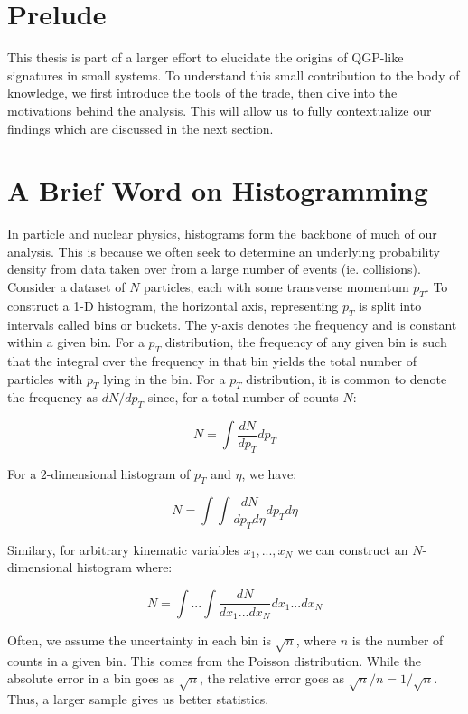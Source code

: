 \documentclass[../main.tex]{subfiles}
\begin{document}
\section{Prelude}
This thesis is part of a larger effort to elucidate the origins of QGP-like signatures in small systems. To understand this small contribution to the body of knowledge, we first introduce the tools of the trade, then dive into the motivations behind the analysis. This will allow us to fully contextualize our findings which are discussed in the next section.

\section{A Brief Word on Histogramming}

In particle and nuclear physics, histograms form the backbone of much of our analysis. This is because we often seek to determine an underlying probability density from data taken over from a large number of events (ie. collisions). Consider a dataset of $N$ particles, each with some transverse momentum $p_T$. To construct a 1-D histogram, the horizontal axis, representing $p_T$ is split into intervals called bins or buckets. The y-axis denotes the frequency and is constant within a given bin. For a $p_T$ distribution, the frequency of any given bin is such that the integral over the frequency in that bin yields the total number of particles with $p_T$ lying in the bin. For a $p_T$ distribution, it is common to denote the frequency as $dN/dp_T$ since, for a total number of counts $N$:

\begin{equation}
    N = \int \frac{dN}{dp_T} dp_T
\end{equation}

For a $2$-dimensional histogram of $p_T$ and $\eta$, we have:

\begin{equation}
    N = \int \int \frac{dN}{dp_T d\eta} dp_T d\eta
\end{equation}

Similary, for arbitrary kinematic variables $x_1,...,x_N$ we can construct an $N$-dimensional histogram where:

\begin{equation}
    N = \int ... \int \frac{dN}{dx_1...dx_N} dx_1...dx_N  
\end{equation}

Often, we assume the uncertainty in each bin is $\sqrt{n}$, where $n$ is the number of counts in a given bin. This comes from the Poisson distribution. While the absolute error in a bin goes as $\sqrt{n}$, the relative error goes as $\sqrt{n}/n = 1/\sqrt{n}$. Thus, a larger sample gives us better statistics. 
\end{document}
